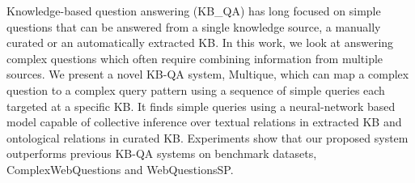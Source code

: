 Knowledge-based question answering (KB\_QA) has long focused on simple questions that can be answered from a single knowledge source, a manually curated or an automatically extracted KB. In this work, we look at answering complex questions which often require combining information from multiple sources. We present a novel KB-QA system, Multique, which can map a complex question to a complex query pattern using a sequence of simple queries each targeted at a specific KB. It finds simple queries using a neural-network based model capable of collective inference over textual relations in extracted KB and ontological relations in curated KB. Experiments show that our proposed system outperforms previous KB-QA systems on benchmark datasets, ComplexWebQuestions and WebQuestionsSP.
